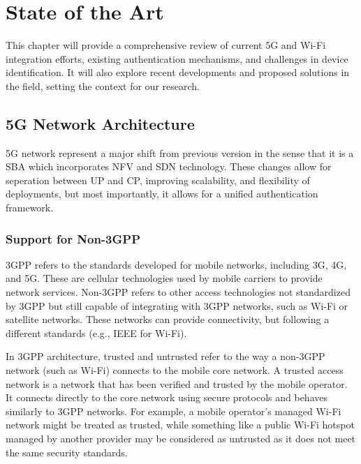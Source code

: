 \chapter{State of the Art}%
\label{chapter:State of the Art}

\begin{introduction}
This chapter will provide a comprehensive review of current \ac{5G} and Wi-Fi integration efforts, existing authentication mechanisms, and challenges in device identification. It will also explore recent developments and proposed solutions in the field, setting the context for our research.
\end{introduction}

\section{\ac{5G} Network Architecture}

\ac{5G} network represent a major shift from previous version in the sense that it is a \ac{SBA} which incorporates \ac{NFV} and \ac{SDN} technology. These changes allow for seperation between \ac{UP} and \ac{CP}, improving scalability, and flexibility of deployments, but most importantly, it allows for a unified authentication framework.~\cite{23.501-p56}

\subsection{Support for Non-3GPP}

\ac{3GPP} refers to the standards developed for mobile networks, including 3G, 4G, and \ac{5G}. These are cellular technologies used by mobile carriers to provide network services. Non-\ac{3GPP} refers to other access technologies not standardized by \ac{3GPP} but still capable of integrating with \ac{3GPP} networks, such as Wi-Fi or satellite networks. These networks can provide connectivity, but following a different standards (e.g., IEEE for Wi-Fi).

In \ac{3GPP} architecture, trusted and untrusted refer to the way a non-\ac{3GPP} network (such as Wi-Fi) connects to the mobile core network. A trusted access network is a network that has been verified and trusted by the mobile operator. It connects directly to the core network using secure protocols and behaves similarly to \ac{3GPP} networks. For example, a mobile operator’s managed Wi-Fi network might be treated as trusted, while something like a public Wi-Fi hotspot managed by another provider may be considered as untrusted as it does not meet the same security standards.

